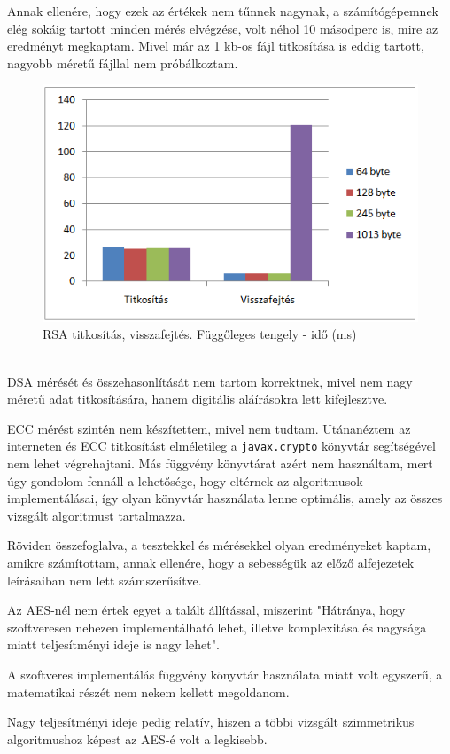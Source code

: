 \noindent Annak ellenére, hogy ezek az értékek nem  tűnnek nagynak, a számítógépemnek elég sokáig tartott minden mérés elvégzése, volt néhol 10 másodperc is, mire az eredményt megkaptam. Mivel már az 1 kb-os fájl titkosítása is eddig tartott, nagyobb méretű fájllal nem próbálkoztam.
\begin{figure}[h]
	\centering
	\includegraphics[scale=0.8]{images/alg_graf_4.png}
	\caption{RSA titkosítás, visszafejtés. Függőleges tengely - idő (ms)}
	\label{fig:rsa_graf}
\end{figure}
\\ \noindent DSA mérését és összehasonlítását nem tartom korrektnek, mivel nem nagy méretű adat titkosítására, hanem digitális aláírásokra lett kifejlesztve.

ECC mérést szintén nem készítettem, mivel nem tudtam. Utánanéztem az interneten és ECC titkosítást elméletileg a \texttt{javax.crypto} könyvtár segítségével nem lehet végrehajtani. Más függvény könyvtárat azért nem használtam, mert úgy gondolom fennáll a lehetősége, hogy eltérnek az algoritmusok implementálásai, így olyan könyvtár használata lenne optimális, amely az összes vizsgált algoritmust tartalmazza.

\noindent Röviden összefoglalva, a tesztekkel és mérésekkel olyan eredményeket kaptam, amikre számítottam, annak ellenére, hogy a sebességük az előző alfejezetek leírásaiban nem lett számszerűsítve. 

Az AES-nél nem értek egyet a talált állítással, miszerint "Hátránya, hogy szoftveresen nehezen implementálható lehet, illetve komplexitása és nagysága miatt teljesítményi ideje is nagy lehet".

A szoftveres implementálás függvény könyvtár használata miatt volt egyszerű, a matematikai részét nem nekem kellett megoldanom.

Nagy teljesítményi ideje pedig relatív, hiszen a többi vizsgált szimmetrikus algoritmushoz képest az AES-é volt a legkisebb.